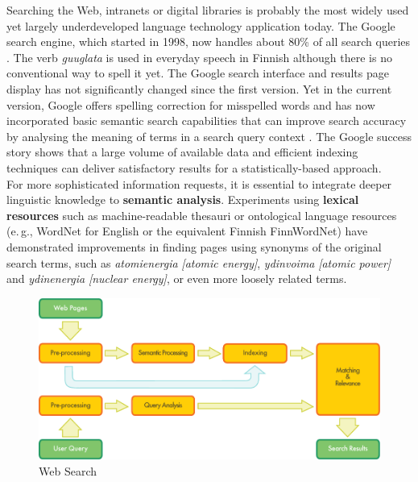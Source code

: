 \begin{multicols}{2}
Searching the Web, intranets or digital libraries is probably the
most widely used yet largely underdeveloped language technology
application today. The Google search engine, which started in 1998,
now handles about 80\% of all search queries \cite{spi1}. The verb
\textit{\foreignlanguage{finnish}{\textit{guuglata}}} is used in everyday
speech in Finnish although there is no conventional way to spell it
yet. The Google search interface and results page display has not
significantly changed since the first version. Yet in the current
version, Google offers spelling correction for misspelled words and
has now incorporated basic semantic search capabilities that can
improve search accuracy by analysing the meaning of terms in a search
query context \cite{Google-rolls}. The Google success story shows that
a large volume of available data and efficient indexing techniques can
deliver satisfactory results for a statistically-based approach.\\
For more sophisticated information requests, it is essential to
integrate deeper linguistic knowledge to \textbf{semantic
analysis}. Experiments using \textbf{lexical resources} such
as machine-readable thesauri or ontological language resources (e.\,g.,
WordNet for English or the equivalent Finnish FinnWordNet) have
demonstrated improvements in finding pages using synonyms of the
original search terms, such as
{\foreignlanguage{finnish}{\textit{atomienergia}}} \textit{[atomic energy]},
{\foreignlanguage{finnish}{\textit{ydinvoima}}} \textit{[atomic power]} and
{\foreignlanguage{finnish}{\textit{ydinenergia}}} \textit{[nuclear energy]},
or even more loosely related terms.

\begin{figure}[htb]
  \center
  \includegraphics[width=\textwidth]{../_media/english/web_search_architecture}
  \caption{Web Search}
  \label{fig:websearcharch-eng}
 \end{figure}


\end{multicols}
